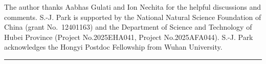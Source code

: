 \documentclass[11pt,reqno]{amsart}
\theoremstyle{definition}
\theoremstyle{definition}
\theoremstyle{definition}
\theoremstyle{definition}
\begin{document}
\bigskip

 The author thanks Aabhas Gulati and Ion Nechita for the helpful discussions and comments. S.-J. Park is supported by the National Natural Science Foundation of China (grant No.~12401163) and the Department of Science and Technology of Hubei Province (Project No.2025EHA041, Project No.2025AFA044). S.-J. Park acknowledges the Hongyi Postdoc Fellowship from Wuhan University.





\bigskip
\hrule
\bigskip
\end{document}
